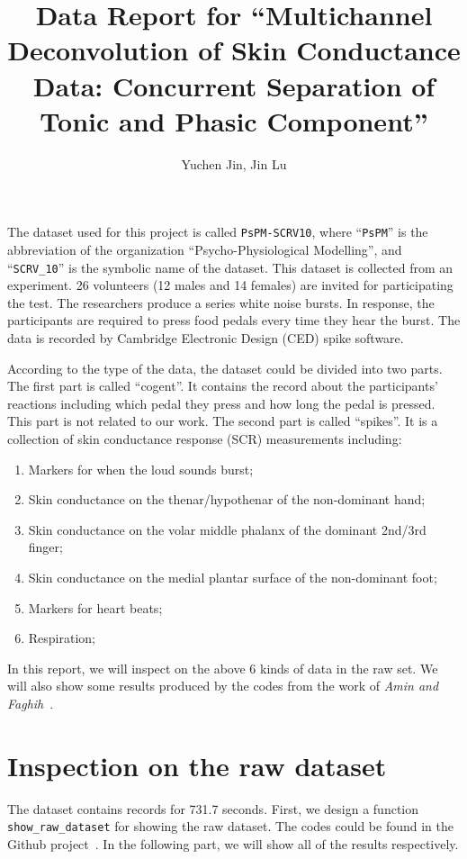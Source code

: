 \documentclass[]{article}
\title{Data Report for ``Multichannel Deconvolution of Skin Conductance Data: Concurrent Separation of Tonic and Phasic Component''}
\author{Yuchen Jin, Jin Lu}
\begin{document}
\maketitle

The dataset used for this project is called \texttt{PsPM-SCRV10}\cite{bach2014pspm}, where ``\texttt{PsPM}'' is the abbreviation of the organization ``Psycho-Physiological Modelling'', and ``\texttt{SCRV\_10}'' is the symbolic name of the dataset. This dataset is collected from an experiment. 26 volunteers (12 males and 14 females) are invited for participating the test. The researchers produce a series white noise bursts. In response, the participants are required to press food pedals every time they hear the burst. The data is recorded by Cambridge Electronic Design (CED) spike software.

According to the type of the data, the dataset could be divided into two parts. The first part is called ``cogent''. It contains the record about the participants' reactions including which pedal they press and how long the pedal is pressed. This part is not related to our work. The second part is called ``spikes''. It is a collection of skin conductance response (SCR) measurements including:

\begin{enumerate}
  \item Markers for when the loud sounds burst;
  \item Skin conductance on the thenar/hypothenar of the non-dominant hand;
  \item Skin conductance on the volar middle phalanx of the dominant 2nd/3rd finger;
  \item Skin conductance on the medial plantar surface of the non-dominant foot;
  \item Markers for heart beats;
  \item Respiration;
\end{enumerate}

In this report, we will inspect on the above 6 kinds of data in the raw set. We will also show some results produced by the codes from the work of \textit{Amin and Faghih}~\cite{amin2019robust}.

\section{Inspection on the raw dataset}

The dataset contains records for 731.7 seconds. First, we design a function \texttt{show\_raw\_dataset} for showing the raw dataset. The codes could be found in the Github project~\cite{jin2020}. In the following part, we will show all of the results respectively.
\end{document}
